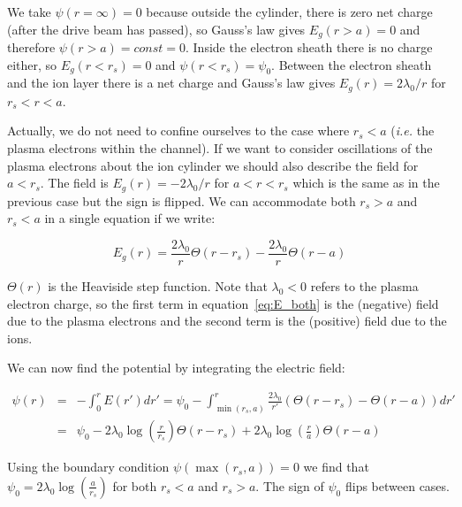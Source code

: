 \documentclass[aps,prl,preprint,groupedaddress]{revtex4-1}
\begin{document}
We take $\psi(r=\infty) = 0$ because outside the cylinder, there is zero net charge (after the drive beam has passed), so Gauss's law gives $E_g(r > a) = 0$ and therefore $\psi(r > a) = const = 0$. Inside the electron sheath there is no charge either, so $E_g(r < r_s) = 0$ and $\psi(r < r_s) = \psi_0$. Between the electron sheath and the ion layer there is a net charge and Gauss's law gives $E_g(r) = 2\lambda_0/r$ for $r_s < r < a$. 

Actually, we do not need to confine ourselves to the case where $r_s < a$ (\emph{i.e.} the plasma electrons within the channel). If we want to consider oscillations of the plasma electrons about the ion cylinder we should also describe the field for $a <  r_s$. The field is $E_g(r) = -2\lambda_0/r$ for $a < r < r_s$  which is the same as in the previous case but the sign is flipped. We can accommodate both $r_s > a$ and $r_s < a$ in a single equation if we write:

\begin{equation}\label{eq:E_both}
E_g(r) = \frac{2\lambda_0}{r}\Theta(r-r_s) - \frac{2\lambda_0}{r}\Theta(r-a)
\end{equation}

$\Theta(r)$ is the Heaviside step function. Note that $\lambda_0 < 0$ refers to the plasma electron charge, so the first term in equation~\ref{eq:E_both} is the (negative) field due to the plasma electrons and the second term is the (positive) field due to the ions.

We can now find the potential by integrating the electric field:

\begin{equation}\label{eq:Psi_both}
\begin{array}{rcl}
\psi(r) & = & -\int_0^r E(r') dr' = \psi_0 - \int_{\min(r_s,a)}^r \frac{2\lambda_0}{r'}\left(\Theta(r-r_s) - \Theta(r-a)\right) dr' \\
& = & \psi_0 - 2\lambda_0\log\left(\frac{r}{r_s}\right)\Theta(r-r_s) + 2\lambda_0\log\left(\frac{r}{a}\right)\Theta(r-a)
\end{array}
\end{equation}

Using the boundary condition $\psi(\max(r_s,a)) = 0$ we find that $\psi_0 = 2\lambda_0 \log\left(\frac{a}{r_s}\right)$ for both $r_s < a$ and $r_s > a$. The sign of $\psi_0$ flips between cases. 

\end{document}
